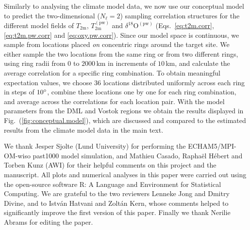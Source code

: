 \documentclass[cp, manuscript]{copernicus}
\begin{document}
Similarly to analysing the climate model data, we now use our conceptual model
to predict the two-dimensional ($N_{\ell}=2$) sampling correlation structures for the
different model fields of $T_{\mathrm{2m}}$, $T_{\mathrm{2m}}^{\mathrm{(pw)}}$
and $\delta^{18}\mathrm{O}^{\mathrm{(pw)}}$ (Eqs.~\ref{eq:t2m.corr},
\ref{eq:t2m.pw.corr} and \ref{eq:oxy.pw.corr}). Since our model space is
continuous, we sample from locations placed \emph{on} concentric rings around
the target site. We either sample the two locations from the same ring or from
two different rings, using ring radii from $0$ to $2000$\,km in increments of
$10$\,km, and calculate the average correlation for a specific ring
combination. To obtain meaningful expectation values, we choose $36$ locations
distributed uniformly across each ring in steps of $10^{\circ}$, combine
these locations one by one for each ring combination, and average across the
correlations for each location pair. With the model parameters from the DML and
Vostok regions we obtain the results displayed in
Fig.~(\ref{fig:conceptual.model}), which are discussed and compared to the
estimated results from the climate model data in the main text.

\noappendix


\begin{acknowledgements}
We thank Jesper Sjolte (Lund University) for performing the ECHAM5/MPI-OM-wiso
past1000 model simulation, and Mathieu Casado, Rapha\"{e}l H\'{e}bert and Torben
Kunz (AWI) for their helpful comments on this project and the manuscript. All
plots and numerical analyses in this paper were carried out using the
open-source software R: A Language and Environment for Statistical Computing. We
are grateful to the two reviewers Lenneke Jong and Dmitry Divine, and to
Istv{\'a}n Hatvani and Zolt{\'a}n Kern, whose comments helped to significantly
improve the first version of this paper. Finally we thank Nerilie Abrams for
editing the paper.
\end{acknowledgements}



\end{document}
